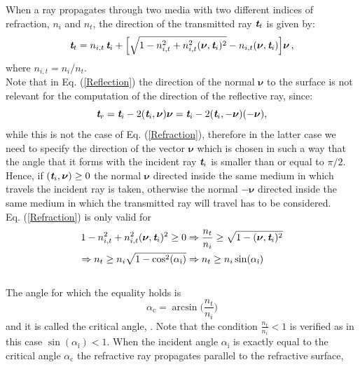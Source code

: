 When a ray propagates through two media with two different indices of refraction, $n_i$ and $n_t$, the direction of the transmitted ray $\textit{\textbf{t}}_t$ is given by:
\begin{equation}\label{Refraction}
\textit{\textbf{t}}_t = n_{i,t}\,\textit{\textbf{t}}_i+
\Big[\sqrt{1-n_{i,t}^2+n_{i,t}^2(\boldsymbol{\nu},\textit{\textbf{t}}_i)^2}-n_{i,t}(\boldsymbol{\nu},\textit{\textbf{t}}_i) \Big]\boldsymbol{\nu}\,,
\end{equation}
where $n_{i,t}=n_i/n_t$. \\
 \indent Note that in Eq. (\ref{Reflection}) the direction of the normal $\boldsymbol{\nu}$ to the surface is not relevant for the computation of the direction of the reflective ray, since:
\begin{equation}
\textit{\textbf{t}}_r = \textit{\textbf{t}}_i-2(\textit{\textbf{t}}_i,\boldsymbol{\nu})\boldsymbol{\nu}= \textit{\textbf{t}}_i-2(\textit{\textbf{t}}_i,-\boldsymbol{\nu})(-\boldsymbol{\nu}) ,
\end{equation}
while this is not the case of Eq. (\ref{Refraction}), therefore in the latter case we need to specify the direction of the vector $\boldsymbol{\nu}$ which is chosen in such a way that the angle that it forms with the incident ray $\textit{\textbf{t}}_i$ is smaller than or equal to $\pi/2$. Hence, if $(\textit{\textbf{t}}_i, \boldsymbol{\nu})\geq0$ the normal $\boldsymbol{\nu}$ directed inside the same medium in which travels the incident ray is taken, otherwise the normal $-\boldsymbol{\nu}$ directed inside the same medium in which the transmitted ray will travel has to be considered. \\ \indent
Eq. (\ref{Refraction}) is only valid for 
\begin{equation}\label{tir}\begin{split}
1-n_{i,t}^2+n_{i,t}^2(\boldsymbol{\nu},\textit{\textbf{t}}_i)^2\geq 0 & \Rightarrow \frac{n_t}{n_i}\geq \sqrt{1-(\boldsymbol{\nu},\textit{\textbf{t}}_i)^2}\\
\Rightarrow n_t\geq n_i\sqrt{1-\cos^2(\alpha_\textrm{i})} & \Rightarrow  n_t\geq n_i \sin(\alpha_\textrm{i})
\end{split}
\end{equation}
\\ \indent
 The angle for which the equality holds is
\begin{equation}\label{critical}
\alpha_{\textrm{c}} = \arcsin\Big(\frac{n_t}{n_i}\Big)
\end{equation} and it is called the critical angle, \cite{chaves2015introduction}.
Note that the condition $\frac{n_t}{n_i}<1$ is verified as in this case $\sin(\alpha_\textrm{i})<1$.
When the incident angle $\alpha_{\textrm{i}}$ is exactly equal to the critical angle $\alpha_{\textrm{c}}$ the refractive ray propagates parallel to the refractive surface, 
